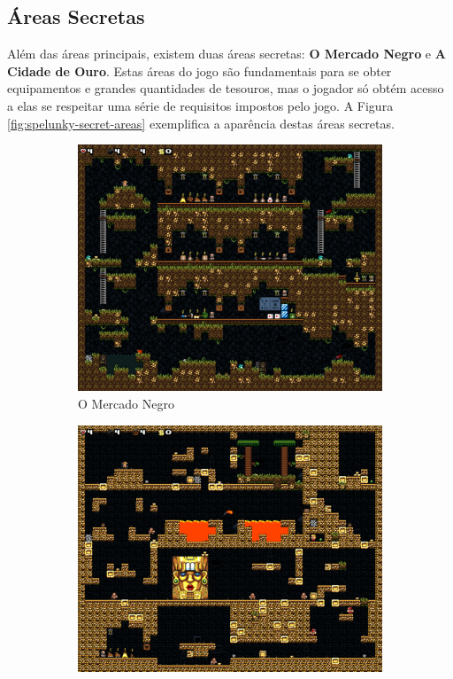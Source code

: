\subsection{Áreas Secretas}
Além das áreas principais, existem duas áreas secretas: \textbf{O Mercado Negro}
e \textbf{A Cidade de Ouro}. Estas áreas do jogo são fundamentais para se obter
equipamentos e grandes quantidades de tesouros, mas o jogador só obtém acesso a
elas se respeitar uma série de requisitos impostos pelo jogo. A Figura
\ref{fig:spelunky-secret-areas} exemplifica a aparência destas áreas secretas.

\begin{figure}[htb!]
\centering
	\begin{subfigure}[b]{0.4\textwidth}
		\includegraphics[width=\textwidth]{fig/spelunky-blackmarket.pdf}
		\caption{O Mercado Negro}
		\label{fig:spelunky-blackmarket}
	\end{subfigure}
	\begin{subfigure}[b]{0.4\textwidth}
		\includegraphics[width=\textwidth]{fig/spelunky-cityofgold.pdf}

\end{subfigure}
\end{figure}
